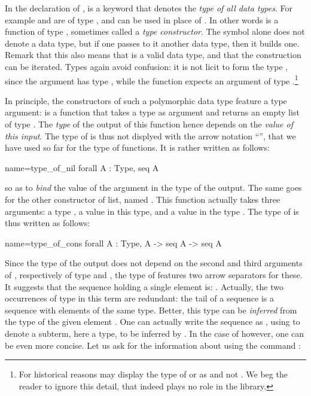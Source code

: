In the declaration of ,  is a keyword that denotes the
\emph{type of all data types}.  For example  and  are of type
, and can be used in place of .
In other words  is a function of type , sometimes
called a \emph{type constructor}.  The symbol  alone does not
denote a data type,
but if one passes to it another data type, then it builds one.  Remark
that this also means that  is a valid data type, and
that the construction can be iterated.
Types again avoid confusion: it is not licit to form the type ,
since the argument  has type , while the function
 expects an argument of type .\footnote{For historical
reasons \Coq{} may display the type of  or  as 
and not .  We beg the reader to ignore this detail, that indeed
plays no role in the \mcbMC{} library.}

In principle, the constructors of such a polymorphic data type feature
a type argument:
 is a function that takes a type  as argument and returns
an empty list of type . The \emph{type} of the output of
this function hence depends on the \emph{value of this input}. The
type of  is thus not displyed with the arrow notation
``'', that we have used so far for the type of
functions. It is rather written as follows:

\begin{coq}{name=type_of_nil}{}
  forall A : Type, seq A
\end{coq}
so as to \emph{bind} the value  of the argument in the type of
the output. The same goes for the other constructor of list, named
.  This function actually takes three arguments: a type ,
a value in this type, and a value in the type .  The type
of  is thus written as follows:

\begin{coq}{name=type_of_cons}{}
  forall A : Type, A -> seq A -> seq A
\end{coq}
 Since the type of
the output does not depend on the second and third arguments of
, respectively of type  and , the type of
 features two arrow separators for these.
It suggests that the sequence holding a single element  is:
. Actually, the two
occurrences of type  in this term are redundant: the tail of a
sequence is a sequence with elements of the same type. Better, this type can be
\emph{inferred} from the type of the given element . One can
actually write the sequence as  , using \C{_} to
denote  a subterm, here a type, to be inferred by \Coq{}. In the case of
 however, one can be even more concise. Let us ask for the
information about  using the command :

